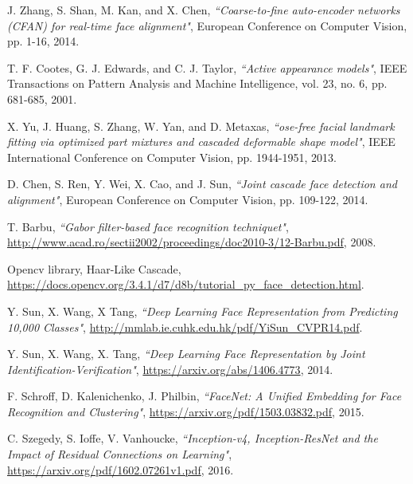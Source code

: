 J. Zhang, S. Shan, M. Kan, and X. Chen,
\textit{``Coarse-to-fine auto-encoder networks (CFAN) for real-time face alignment"}, European Conference on Computer Vision,
pp. 1-16, 2014.

T. F. Cootes, G. J. Edwards, and C. J. Taylor,
\textit{``Active appearance models"},
IEEE Transactions on Pattern Analysis and Machine Intelligence,
vol. 23, no. 6, pp. 681-685, 2001.

X. Yu, J. Huang, S. Zhang, W. Yan, and D. Metaxas,
\textit{``ose-free facial landmark fitting via optimized part mixtures and cascaded deformable shape model"},
IEEE International Conference on Computer Vision,
pp. 1944-1951, 2013.

D. Chen, S. Ren, Y. Wei, X. Cao, and J. Sun,
\textit{``Joint cascade face detection and alignment"},
European Conference on Computer Vision,
pp. 109-122, 2014.


T. Barbu,
\textit{``Gabor filter-based face recognition techniquet"},
\url{http://www.acad.ro/sectii2002/proceedings/doc2010-3/12-Barbu.pdf}, 2008.

Opencv library, Haar-Like Cascade,
\url{https://docs.opencv.org/3.4.1/d7/d8b/tutorial_py_face_detection.html}.

Y. Sun, X. Wang, X Tang,
\textit{``Deep Learning Face Representation from Predicting 10,000 Classes"},
\url{http://mmlab.ie.cuhk.edu.hk/pdf/YiSun_CVPR14.pdf}.

Y. Sun, X. Wang, X. Tang,
\textit{``Deep Learning Face Representation by Joint Identification-Verification"},
\url {https://arxiv.org/abs/1406.4773}, 2014.

F. Schroff, D. Kalenichenko, J. Philbin,
\textit{``FaceNet: A Unified Embedding for Face Recognition and Clustering"},  \url{https://arxiv.org/pdf/1503.03832.pdf}, 2015.


C. Szegedy, S. Ioffe, V. Vanhoucke,
\textit{``Inception-v4, Inception-ResNet and the Impact of Residual Connections on Learning"},
\url{https://arxiv.org/pdf/1602.07261v1.pdf}, 2016.



